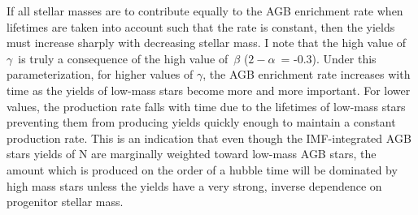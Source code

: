 \documentclass[\main/notes.tex]{subfiles}
\begin{document}
If all stellar masses are to contribute equally to the AGB enrichment rate when 
lifetimes are taken into account such that the rate is constant, then the 
yields must increase sharply with decreasing stellar mass. I note that the 
high value of~$\gamma$~is truly a consequence of the high value of~$\beta$ 
($2 - \alpha$~= -0.3). Under this parameterization, for higher values of 
$\gamma$, the AGB enrichment rate increases with time as the yields of low-mass 
stars become more and more important. For lower values, the production rate 
falls with time due to the lifetimes of low-mass stars preventing them from 
producing yields quickly enough to maintain a constant production rate. This 
is an indication that even though the IMF-integrated AGB stars yields of N are 
marginally weighted toward low-mass AGB stars, the amount which is produced on 
the order of a hubble time will be dominated by high mass stars unless the 
yields have a very strong, inverse dependence on progenitor stellar mass. 

\biblio  
\end{document}
